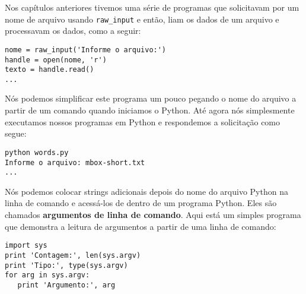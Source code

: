 
Nos capítulos anteriores tivemos uma série de programas que solicitavam
por um nome de arquivo usando \verb"raw_input" e então, liam os dados 
de um arquivo e processavam os dados, como a seguir:

\beforeverb
\begin{verbatim}
nome = raw_input('Informe o arquivo:')
handle = open(nome, 'r')
texto = handle.read()
...
\end{verbatim}
\afterverb

Nós podemos simplificar este programa um pouco pegando o nome do arquivo
a partir de um comando quando iniciamos o Python. Até agora 
nós simplesmente executamos nossos programas em Python e respondemos a
solicitação como segue:

\beforeverb
\begin{verbatim}
python words.py
Informe o arquivo: mbox-short.txt
...
\end{verbatim}
\afterverb

Nós podemos colocar strings adicionais depois do nome do arquivo Python na linha de
comando e acessá-los de dentro de um programa Python. Eles são chamados {\bf argumentos de linha
de comando}. Aqui está um simples programa que demonstra a leitura de argumentos a partir de uma 
linha de comando:

\beforeverb
\begin{verbatim}
import sys
print 'Contagem:', len(sys.argv)
print 'Tipo:', type(sys.argv)
for arg in sys.argv:
   print 'Argumento:', arg
\end{verbatim}
\afterverb

